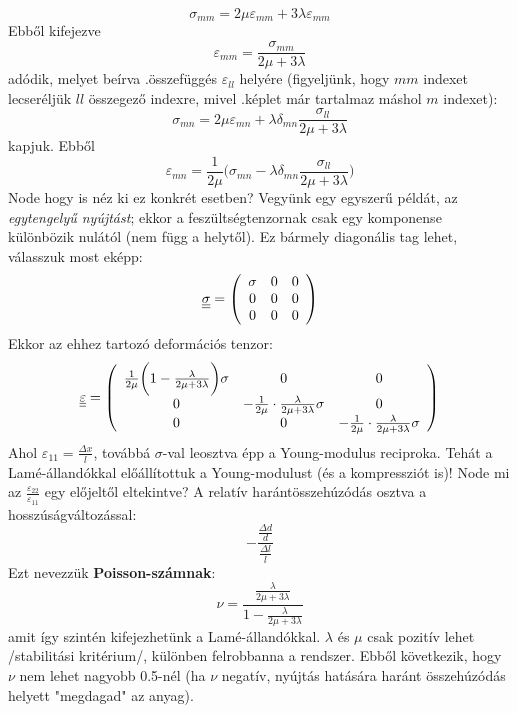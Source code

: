 \documentclass[a4paper, 12pt, titlepage]{article}
\begin{document}
\[\sigma_{mm}=2\mu\varepsilon_{mm}+3\lambda\varepsilon_{mm}\]
Ebből kifejezve
\[\varepsilon_{mm}=\frac{\sigma_{mm}}{2\mu+3\lambda}\]
adódik, melyet beírva .\hspace{1mm}összefüggés $\varepsilon_{ll}$ helyére (figyeljünk, hogy $mm$ indexet lecseréljük $ll$ összegező indexre, mivel .\hspace{1mm}képlet már tartalmaz máshol $m$ indexet):
\[\sigma_{mn}=2\mu\varepsilon_{mn}+\lambda\delta_{mn}\frac{\sigma_{ll}}{2\mu+3\lambda}\]
kapjuk. Ebből
	\begin{equation}
\varepsilon_{mn}=\frac{1}{2\mu}\bigg(\sigma_{mn}-\lambda\delta_{mn}\frac{\sigma_{ll}}{2\mu+3\lambda}\bigg)
	\label{eq:epsilon} %
	\end{equation}
Node hogy is néz ki ez konkrét esetben?
\newline
Vegyünk egy egyszerű példát, az \textit{egytengelyű nyújtást}; ekkor a feszültségtenzornak csak egy komponense különbözik nulától (nem függ a helytől). Ez bármely diagonális tag lehet, válasszuk most eképp:
	\[ \underline{\underline{\sigma}}=\left(
	\begin{array}{ccc}
	$$\sigma$$&0&0\\
	0&0&0\\
	0&0&0
	\end{array} \right) \]
\newline
Ekkor az ehhez tartozó deformációs tenzor:
	\[ \underline{\underline{\varepsilon}}=\left(
	\begin{array}{ccc}
	$$\frac{1}{2\mu}\bigg(1-\frac{\lambda}{2\mu+3\lambda}\bigg)\sigma$$&0&0\\
	0&$$-\frac{1}{2\mu}\cdot\frac{\lambda}{2\mu+3\lambda}\sigma$$&0\\
	0&0&$$-\frac{1}{2\mu}\cdot\frac{\lambda}{2\mu+3\lambda}\sigma$$
	\end{array}\right) \]
Ahol $\varepsilon_{11}=\frac{\Delta x}{l}$, továbbá $\sigma$-val leosztva épp a Young-modulus reciproka. Tehát a Lamé-állandókkal előállítottuk a Young-modulust (és a kompressziót is)! Node mi az $\frac{\varepsilon_{22}}{\varepsilon_{11}}$ egy előjeltől eltekintve? A relatív harántösszehúzódás osztva a hosszúságváltozással:
\[-\frac{\frac{\Delta d}{d}}{\frac{\Delta l}{l}}\]
Ezt nevezzük \textbf{Poisson-számnak}:
\[\nu=\frac{\frac{\lambda}{2\mu+3\lambda}}{1-\frac{\lambda}{2\mu+3\lambda}}\]
amit így szintén kifejezhetünk a Lamé-állandókkal.
\newline
$\lambda$ és $\mu$ csak pozitív lehet /stabilitási kritérium/, különben felrobbanna a rendszer. Ebből következik, hogy $\nu$ nem lehet nagyobb 0.5-nél (ha $\nu$ negatív, nyújtás hatására haránt összehúzódás helyett "megdagad" az anyag).
\end{document}

